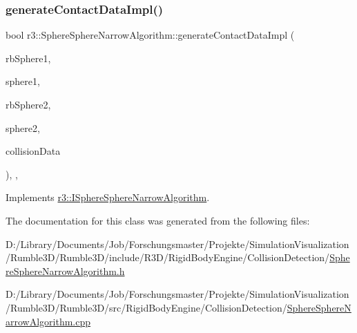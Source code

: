 \subsubsection{\texorpdfstring{generate\+Contact\+Data\+Impl()}{generateContactDataImpl()}}
{\footnotesize\ttfamily bool r3\+::\+Sphere\+Sphere\+Narrow\+Algorithm\+::generate\+Contact\+Data\+Impl (\begin{DoxyParamCaption}\item[{\mbox{\hyperlink{classr3_1_1_rigid_body}{Rigid\+Body}} $\ast$}]{rb\+Sphere1,  }\item[{\mbox{\hyperlink{classr3_1_1_collision_sphere}{Collision\+Sphere}} $\ast$}]{sphere1,  }\item[{\mbox{\hyperlink{classr3_1_1_rigid_body}{Rigid\+Body}} $\ast$}]{rb\+Sphere2,  }\item[{\mbox{\hyperlink{classr3_1_1_collision_sphere}{Collision\+Sphere}} $\ast$}]{sphere2,  }\item[{\mbox{\hyperlink{classr3_1_1_collision_data}{Collision\+Data}} \&}]{collision\+Data }\end{DoxyParamCaption})\hspace{0.3cm}{\ttfamily [override]}, {\ttfamily [protected]}, {\ttfamily [virtual]}}



Implements \mbox{\hyperlink{classr3_1_1_i_sphere_sphere_narrow_algorithm_a9e616d04c7ee379d973ec81ea0067cc3}{r3\+::\+I\+Sphere\+Sphere\+Narrow\+Algorithm}}.



The documentation for this class was generated from the following files\+:\begin{DoxyCompactItemize}
\item 
D\+:/\+Library/\+Documents/\+Job/\+Forschungsmaster/\+Projekte/\+Simulation\+Visualization/\+Rumble3\+D/\+Rumble3\+D/include/\+R3\+D/\+Rigid\+Body\+Engine/\+Collision\+Detection/\mbox{\hyperlink{_sphere_sphere_narrow_algorithm_8h}{Sphere\+Sphere\+Narrow\+Algorithm.\+h}}\item 
D\+:/\+Library/\+Documents/\+Job/\+Forschungsmaster/\+Projekte/\+Simulation\+Visualization/\+Rumble3\+D/\+Rumble3\+D/src/\+Rigid\+Body\+Engine/\+Collision\+Detection/\mbox{\hyperlink{_sphere_sphere_narrow_algorithm_8cpp}{Sphere\+Sphere\+Narrow\+Algorithm.\+cpp}}\end{DoxyCompactItemize}
